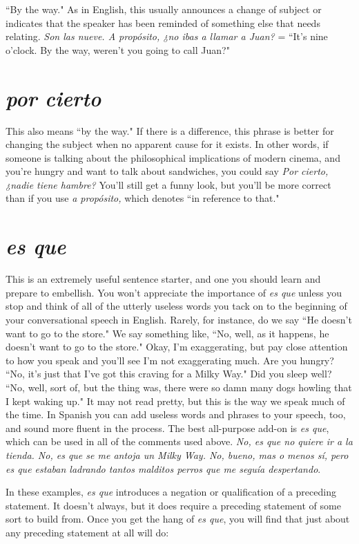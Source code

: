 ``By the way." As in English, this usually announces a change
of subject or indicates that the speaker has been reminded of something else that needs relating. \emph{Son las nueve. A propósito, ¿no ibas a
	llamar a Juan?} = ``It's nine o'clock. By the way, weren't you going to
call Juan?"

\section{\emph{por cierto}}

This also means ``by the way." If there is a difference, this
phrase is better for changing the subject when no apparent cause for
it exists. In other words, if someone is talking about the philosophical
implications of modern cinema, and you're hungry and want to talk
about sandwiches, you could say \emph{Por cierto, ¿nadie tiene hambre?}
You'll still get a funny look, but you'll be more correct than if you use
\emph{a propósito,} which denotes ``in reference to that."

\section{\emph{es que}}

This is an extremely useful sentence starter, and one you
should learn and prepare to embellish. You won't appreciate the importance of \emph{es que} unless you stop and think of all of the utterly useless
words you tack on to the beginning of your conversational speech in
English. Rarely, for instance, do we say ``He doesn't want to go to the
store." We say something like, ``No, well, as it happens, he doesn't
want to go to the store." Okay, I'm exaggerating, but pay close attention to how you speak and you'll see I'm not exaggerating much. Are
you hungry? ``No, it's just that I've got this craving for a Milky Way."
Did you sleep well? ``No, well, sort of, but the thing was, there were
so damn many dogs howling that I kept waking up." It may not read
pretty, but this is the way we speak much of the time. In Spanish you
can add useless words and phrases to your speech, too, and sound more
fluent in the process. The best all-purpose add-on is \emph{es que}, which can
be used in all of the comments used above. \emph{No, es que no quiere ir a
	la tienda. No, es que se me antoja un Milky Way. No, bueno, mas o
	menos sí, pero es que estaban ladrando tantos malditos perros que
	me seguía despertando}.

In these examples, \emph{es que} introduces a negation or qualification of a preceding statement. It doesn't always, but it does require a preceding statement of some sort to build from. Once you get the hang of \emph{es
	que}, you will find that just about any preceding statement at all will do:

